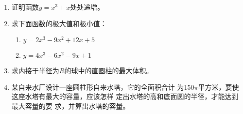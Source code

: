 \begin{ex}
\begin{enumerate}
    \item 证明函数$y=x^3+x$处处递增。
    \item 求下面函数的极大值和极小值：
\begin{enumerate}
    \item $y=2x^3-9x^2+12x+5$
    \item $y=4x^3-6x^2-9x+1$
\end{enumerate}
    \item 求内接于半径为$R$的球中的直圆柱的最大体积。
    \item 某自来水厂设计一座圆柱形自来水塔，它的全面积合计
    为$150\pi$平方米，要使这座水塔有最大的容量，应该怎样
    定出水塔的高和底面圆的半径，才能达到最大容量的要
    求，并算出水塔的容量。
\end{enumerate}
\end{ex}


